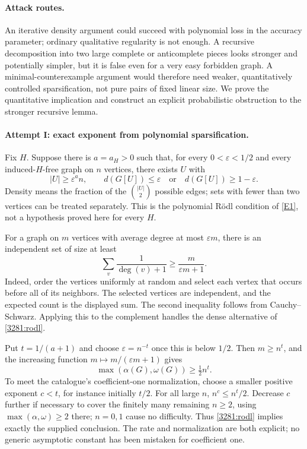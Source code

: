 \documentclass[11pt,a4paper]{article}
\newcommand{\eref}[2]{\hyperlink{extra:#1:#2}{[E#2]}}
\numberwithin{equation}{section}
\begin{document}
\paragraph{Attack routes.}
An iterative density argument could succeed with polynomial loss in the
accuracy parameter; ordinary qualitative regularity is not enough.
A recursive decomposition into two large complete or anticomplete
pieces looks stronger and potentially simpler, but it is false even
for a very easy forbidden graph.  A minimal-counterexample argument
would therefore need weaker, quantitatively controlled sparsification,
not pure pairs of fixed linear size.  We prove the quantitative
implication and construct an explicit probabilistic obstruction to the
stronger recursive lemma.

\paragraph{Attempt I: exact exponent from polynomial sparsification.}
Fix $H$.  Suppose there is $a=a_H>0$ such that, for every
$0<\varepsilon<1/2$ and every induced-$H$-free graph on $n$ vertices,
there exists $U$ with
\begin{equation}\label{3281:rodl}
 |U|\geq\varepsilon^a n,\qquad
 d(G[U])\leq\varepsilon\quad\text{or}\quad
 d(G[U])\geq1-\varepsilon.
\end{equation}
Density means the fraction of the $\binom{|U|}{2}$ possible edges;
sets with fewer than two vertices can be treated separately.
This is the polynomial R\"odl condition of \eref{3281}{1}, not a
hypothesis proved here for every $H$.

For a graph on $m$ vertices with average degree at most $\varepsilon m$,
there is an independent set of size at least
\begin{equation}\label{3281:caro}
 \sum_{v}\frac1{\deg(v)+1}\geq\frac{m}{\varepsilon m+1}.
\end{equation}
Indeed, order the vertices uniformly at random and select each vertex
that occurs before all of its neighbors.  The selected vertices are
independent, and the expected count is the displayed sum.  The second
inequality follows from Cauchy--Schwarz.  Applying this to the complement
handles the dense alternative of \eqref{3281:rodl}.

Put $t=1/(a+1)$ and choose $\varepsilon=n^{-t}$ once this is below
$1/2$.  Then $m\geq n^t$, and the increasing function
$m\mapsto m/(\varepsilon m+1)$ gives
\[
 \max(\alpha(G),\omega(G))\geq\tfrac12n^t.
\]
To meet the catalogue's coefficient-one normalization, choose a smaller
positive exponent $c<t$, for instance initially $t/2$.  For all large
$n$, $n^c\leq n^t/2$.  Decrease $c$ further if necessary to cover the
finitely many remaining $n\geq2$, using
$\max(\alpha,\omega)\geq2$ there; $n=0,1$ cause no difficulty.
Thus \eqref{3281:rodl} implies exactly the supplied conclusion.
The rate and normalization are both explicit; no generic asymptotic
constant has been mistaken for coefficient one.
\end{document}
